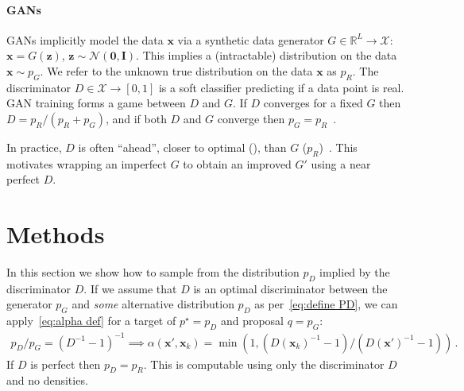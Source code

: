 \documentclass{article}
\renewcommand{\vec}[1]{{\boldsymbol{\mathbf{#1}}}} %
\newcommand{\R}{\mathbb{R}}
\newcommand{\set}[1]{\mathcal{#1}}
\newcommand{\sample}{\sim}
\newcommand{\norm}{\mathcal{N}}
\newcommand{\target}{{p^\star}}
\newcommand{\prop}{q}
\newcommand{\PG}{{p_G}}
\newcommand{\PD}{{p_D}}
\newcommand{\PR}{{p_R}}
\newcommand{\accept}{\alpha}
\newcommand{\setx}{\set{X}}
\begin{document}
\paragraph{GANs}
GANs implicitly model the data $\vec x$ via a synthetic data generator $G \in \R^L \rightarrow \setx$: $\vec x = G(\vec z)$, $\vec z \sample \norm(\vec 0, \vec I)$.
This implies a (intractable) distribution on the data $\vec x \sample \PG$.
We refer to the unknown true distribution on the data $\vec x$ as $\PR$.
The discriminator $D \in \setx \rightarrow [0,1]$ is a soft classifier predicting if a data point is real.
GAN training forms a game between $D$ and $G$.
If $D$ converges for a fixed $G$ then $D = \PR/(\PR + \PG)$, and if both $D$ and $G$ converge then $\PG = \PR$~\citep{Goodfellow2014}.

In practice, $D$ is often ``ahead'', closer to optimal (\smash{$\PR/(\PR + \PG)$}), than $G$ ($\PR$)~\citep{Shibuya2017}.
This motivates wrapping an imperfect $G$ to obtain an improved $G'$ using a near perfect $D$.

\section{Methods}
\label{sec:Methods}

In this section we show how to sample from the distribution $\PD$ implied by the discriminator $D$.
If we assume that $D$ is an optimal discriminator between the generator $\PG$ and \emph{some} alternative distribution $\PD$ as per~\eqref{eq:define PD}, we can apply~\eqref{eq:alpha def} for a target of $\target=\PD$ and proposal $\prop=\PG$:
\begin{align}
  \PD/\PG = (D^{-1}-1)^{-1} \implies
  \accept(\vec x', \vec x_k) = \min\left(1, (D(\vec x_k)^{-1} - 1)/(D(\vec x')^{-1} - 1)\right)\,. \label{eq:alpha from D}
\end{align}
If $D$ is perfect then $\PD = \PR$.
This is computable using only the discriminator $D$ and no densities.
\end{document}
